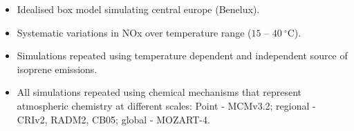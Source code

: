 \begin{BlueBox}
    \vskip-1cm
    \begin{block}{}
        \begin{itemize} 
            \item Idealised box model simulating central europe (Benelux).
            \item Systematic variations in NOx over temperature range ($15$ -- $40~^{\circ}$C).
            \item Simulations repeated using temperature dependent and independent source of isoprene emissions.
            \item All simulations repeated using chemical mechanisms that represent atmospheric chemistry at different scales: Point - MCMv3.2; regional - CRIv2, RADM2, CB05; global - MOZART-4.
        \end{itemize}
    \end{block}
\end{BlueBox}
